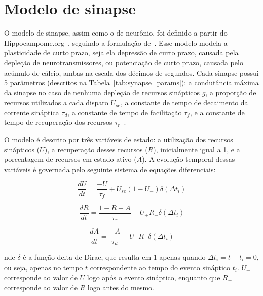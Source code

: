 

\section{Modelo de sinapse}

O modelo de sinapse, assim como o de neurônio, foi definido a partir do Hippocampome.org~\cite{wheelerHippocampomeorg2023},
seguindo a formulação de~. Esse modelo modela a
plasticidade de curto prazo, seja ela depressão de curto prazo, causada pela depleção de neurotransmissores, ou potenciação de
curto prazo, causada pelo acúmulo de cálcio, ambas na escala dos décimos de segundos. Cada sinapse possui 5 parâmetros (descritos
na Tabela~\ref{tab:synapse_params}): a condutância máxima da sinapse no caso de nenhuma depleção de recursos sinápticos $g$, a proporção de
recursos utilizados a cada disparo $U_{se}$, a constante de tempo de decaimento da corrente sináptica $\tau_d$,
a constante de tempo de facilitação $\tau_f$, e a constante de tempo de recuperação dos recursos $\tau_r$~\cite{moradiNormalized2022}.

O modelo é descrito por três variáveis de estado: a utilização dos recursos sinápticos ($U$), a recuperação desses recursos ($R$),
inicialmente igual a 1, e a porcentagem de recursos em estado ativo ($A$). A evolução temporal dessas
variáveis é governada pelo seguinte sistema de equações diferenciais:

\begin{equation}
    \label{eq_tsodyks_dU}
    \frac{dU}{dt} = \frac{-U}{\tau_f} + U_{se}(1-U_{-}) \delta(\Delta t_i)
\end{equation}

\begin{equation}
    \label{eq_tsodyks_dR}
    \frac{dR}{dt} = \frac{1-R-A}{\tau_r} - U_{+} R_{-} \delta(\Delta t_i)
\end{equation}

\begin{equation}
    \label{eq_tsodyks_dA}
    \frac{dA}{dt} = \frac{-A}{\tau_d} + U_{+} R_{-} \delta(\Delta t_i)
\end{equation}

nde $\delta$ é a função delta de Dirac, que resulta em 1 apenas quando $\Delta t_i = t - t_i = 0$, ou seja, apenas no tempo $t$
correspondente ao tempo do evento sináptico $t_i$. $U_{+}$ corresponde ao valor de $U$ logo após o evento sináptico, enquanto que
$R_{-}$ corresponde ao valor de $R$ logo antes do mesmo.

